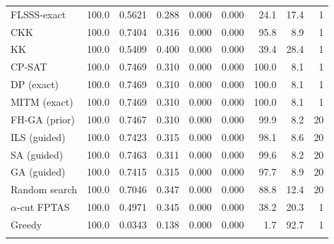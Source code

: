 \begin{table}[htbp]
\begin{tabular}{lrrrrrrrr}
FLSSS-exact & 100.0 & 0.5621 & 0.288 & 0.000 & 0.000 & 24.1 & 17.4 & 1 \\
CKK & 100.0 & 0.7404 & 0.316 & 0.000 & 0.000 & 95.8 & 8.9 & 1 \\
KK & 100.0 & 0.5409 & 0.400 & 0.000 & 0.000 & 39.4 & 28.4 & 1 \\
CP-SAT & 100.0 & 0.7469 & 0.310 & 0.000 & 0.000 & 100.0 & 8.1 & 1 \\
DP (exact) & 100.0 & 0.7469 & 0.310 & 0.000 & 0.000 & 100.0 & 8.1 & 1 \\
MITM (exact) & 100.0 & 0.7469 & 0.310 & 0.000 & 0.000 & 100.0 & 8.1 & 1 \\
FH-GA (prior) & 100.0 & 0.7467 & 0.310 & 0.000 & 0.000 & 99.9 & 8.2 & 20 \\
ILS (guided) & 100.0 & 0.7423 & 0.315 & 0.000 & 0.000 & 98.1 & 8.6 & 20 \\
SA (guided) & 100.0 & 0.7463 & 0.311 & 0.000 & 0.000 & 99.6 & 8.2 & 20 \\
GA (guided) & 100.0 & 0.7415 & 0.315 & 0.000 & 0.000 & 97.7 & 8.9 & 20 \\
Random search & 100.0 & 0.7046 & 0.347 & 0.000 & 0.000 & 88.8 & 12.4 & 20 \\
$\alpha$-cut FPTAS & 100.0 & 0.4971 & 0.345 & 0.000 & 0.000 & 38.2 & 20.3 & 1 \\
Greedy & 100.0 & 0.0343 & 0.138 & 0.000 & 0.000 & 1.7 & 92.7 & 1 \\
\botrule
\end{tabular}
\end{table}
